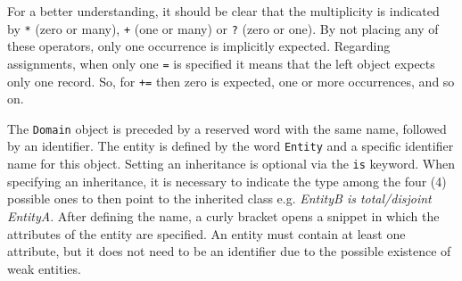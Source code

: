 For a better understanding, it should be clear that the multiplicity is indicated by \texttt{*} (zero or many), \texttt{+} (one or many) or \texttt{?} (zero or one).
By not placing any of these operators, only one occurrence is implicitly expected.
Regarding assignments, when only one \texttt{=} is specified it means that the left object expects only one record.
So, for \texttt{+=} then zero is expected, one or more occurrences, and so on.

The \texttt{Domain} object is preceded by a reserved word with the same name, followed by an identifier.
The entity is defined by the word \texttt{Entity} and a specific identifier name for this object.
Setting an inheritance is optional via the \texttt{is} keyword.
When specifying an inheritance, it is necessary to indicate the type among the four (4) possible ones to then point to the inherited class e.g. \textit{EntityB is total/disjoint EntityA}.
After defining the name, a curly bracket opens a snippet in which the attributes of the entity are specified.
An entity must contain at least one attribute, but it does not need to be an identifier due to the possible existence of weak entities.

